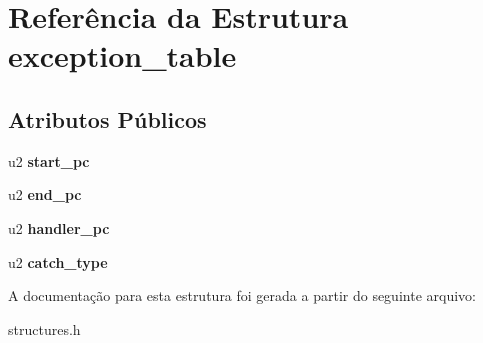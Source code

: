 \hypertarget{structexception__table}{}\section{Referência da Estrutura exception\+\_\+table}
\label{structexception__table}
\subsection*{Atributos Públicos}
\begin{DoxyCompactItemize}
\item 
\mbox{\label{structexception__table_a63da93a2b0f5dc61b3a158a0c7384602}} 
u2 {\bfseries start\+\_\+pc}
\item 
\mbox{\label{structexception__table_aeb4c86c92f02d6fccd52a0a9be9c5dac}} 
u2 {\bfseries end\+\_\+pc}
\item 
\mbox{\label{structexception__table_a8fe6fb5063598ad0d48aab5e617d6a35}} 
u2 {\bfseries handler\+\_\+pc}
\item 
\mbox{\label{structexception__table_ade50b30a987f3d3452a6de69eee0ada5}} 
u2 {\bfseries catch\+\_\+type}
\end{DoxyCompactItemize}


A documentação para esta estrutura foi gerada a partir do seguinte arquivo\+:\begin{DoxyCompactItemize}
\item 
structures.\+h\end{DoxyCompactItemize}
